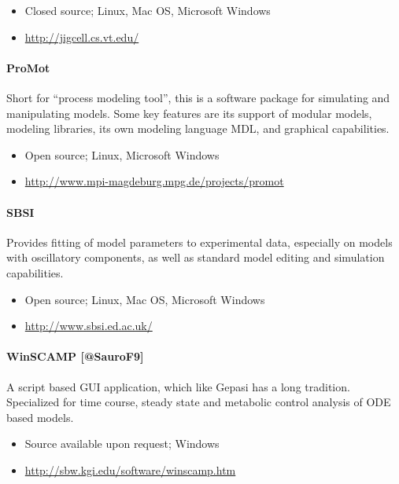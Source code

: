 \documentclass[]{article}
\begin{document}
\begin{itemize}
\item
  Closed source; Linux, Mac OS, Microsoft Windows
\item
  \url{http://jigcell.cs.vt.edu/}
\end{itemize}
\paragraph{ProMot \autocite{mirschel2009promot}}

Short for ``process modeling tool'', this is a software package for
simulating and manipulating models. Some key features are its support of
modular models, modeling libraries, its own modeling language MDL, and
graphical capabilities.

\begin{itemize}
\item
  Open source; Linux, Microsoft Windows
\item
  \url{http://www.mpi-magdeburg.mpg.de/projects/promot}
\end{itemize}
\paragraph{SBSI \autocite{adams2013sbsi}}

Provides fitting of model parameters to experimental data, especially on
models with oscillatory components, as well as standard model editing
and simulation capabilities.

\begin{itemize}
\item
  Open source; Linux, Mac OS, Microsoft Windows
\item
  \url{http://www.sbsi.ed.ac.uk/}
\end{itemize}
\paragraph{WinSCAMP {[}@SauroF9{]} \autocite{SauroScamp93}}

A script based GUI application, which like Gepasi has a long tradition.
Specialized for time course, steady state and metabolic control analysis
of ODE based models.

\begin{itemize}
\item
  Source available upon request; Windows
\item
  \url{http://sbw.kgi.edu/software/winscamp.htm}
\end{itemize}
\end{document}
